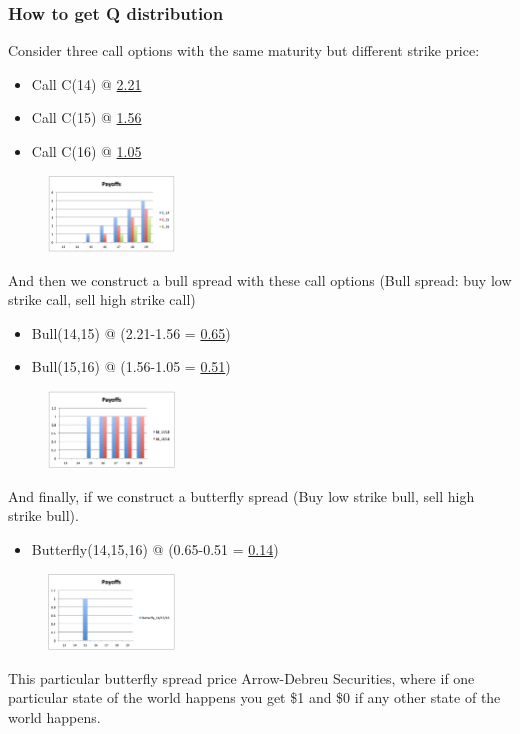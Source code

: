 \begin{multicols}{2}
\subsubsection{How to get Q distribution}
Consider three call options with the same maturity but different strike price:
\begin{itemize}
    \item Call C(14) @ \underline{2.21}
    \item Call C(15) @ \underline{1.56}
    \item Call C(16) @ \underline{1.05}
\end{itemize}
\begin{figure}[H]
    \centering 
    \includegraphics[width =0.3\textwidth]{Figure/Q_call.png}
\end{figure}
And then we construct a bull spread with these call options (Bull spread: buy low strike call, sell high strike call) 
\begin{itemize}
    \item Bull(14,15) @ (2.21-1.56 = \underline{0.65})
    \item Bull(15,16) @ (1.56-1.05 = \underline{0.51})
\end{itemize}
\begin{figure}[H]
    \centering 
    \includegraphics[width =0.3\textwidth]{Figure/Q_bull.png}
\end{figure}
And finally, if we construct a butterfly spread (Buy low strike bull, sell high strike bull). 
\begin{itemize}
    \item Butterfly(14,15,16) @ (0.65-0.51 = \underline{0.14})
\end{itemize}
\begin{figure}[H]
    \centering 
    \includegraphics[width =0.3\textwidth]{Figure/Q_butter.png}
\end{figure}
This particular butterfly spread price Arrow-Debreu Securities, where if one particular state of the world happens you get \$1 and \$0 if any other state of the world happens.\par


\end{multicols}
